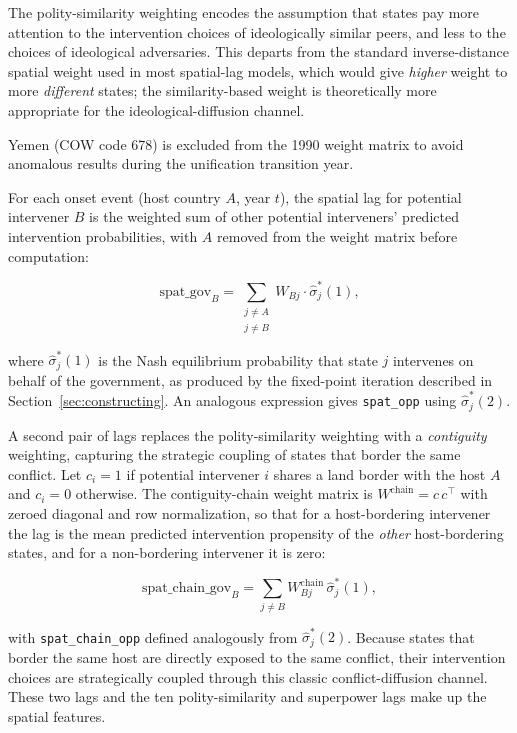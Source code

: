 The polity-similarity weighting encodes the assumption that states pay more
attention to the intervention choices of ideologically similar peers, and less
to the choices of ideological adversaries.  This departs from the standard
inverse-distance spatial weight used in most spatial-lag models, which would
give \textit{higher} weight to more \textit{different} states; the similarity-based weight is
theoretically more appropriate for the ideological-diffusion channel.

Yemen (COW code 678) is excluded from the 1990 weight matrix to avoid
anomalous results during the unification transition year.

For each onset event (host country $A$, year $t$), the spatial lag for potential
intervener $B$ is the weighted sum of other potential interveners' predicted
intervention probabilities, with $A$ removed from the weight matrix before
computation:

\begin{equation*}
\text{spat\_gov}_B = \sum_{\substack{j \neq A \\ j \neq B}} W_{Bj} \cdot \hat{\sigma}_j^*(1),
\end{equation*}

\noindent where $\hat{\sigma}_j^*(1)$ is the Nash equilibrium probability that state $j$
intervenes on behalf of the government, as produced by the fixed-point iteration
described in Section~\ref{sec:constructing}.  An analogous expression gives \texttt{spat\_opp}
using $\hat{\sigma}_j^*(2)$.

A second pair of lags replaces the polity-similarity weighting with a
\textit{contiguity} weighting, capturing the strategic coupling of states that
border the same conflict.  Let $c_i = 1$ if potential intervener $i$ shares a
land border with the host $A$ and $c_i = 0$ otherwise.  The contiguity-chain
weight matrix is $W^{\text{chain}} = c\,c^{\top}$ with zeroed diagonal and row
normalization, so that for a host-bordering intervener the lag is the mean
predicted intervention propensity of the \textit{other} host-bordering states,
and for a non-bordering intervener it is zero:

\begin{equation*}
\text{spat\_chain\_gov}_B = \sum_{j \neq B} W^{\text{chain}}_{Bj}\, \hat{\sigma}_j^*(1),
\end{equation*}

\noindent with \texttt{spat\_chain\_opp} defined analogously from
$\hat{\sigma}_j^*(2)$.  Because states that border the same host are directly
exposed to the same conflict, their intervention choices are strategically
coupled through this classic conflict-diffusion channel.  These two lags and the
ten polity-similarity and superpower lags make up the \FeatW{} spatial features.

